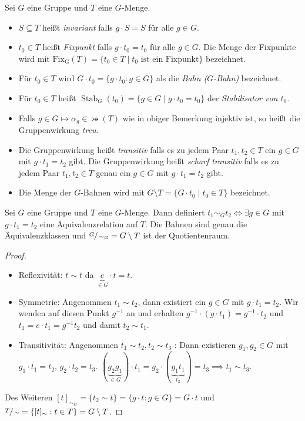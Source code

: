 \begin{definition}
	Sei $G$ eine Gruppe und $T$ eine $G$-Menge.
	\begin{itemize}
		\item $S \subseteq T$ heißt \emph{invariant} falls $g \cdot S = S$ für alle $g \in G$.
		\item $t_0 \in T$ heißt \emph{Fixpunkt} falls $g \cdot t_0 = t_0$ für alle $g \in G$.
			Die Menge der Fixpunkte wird mit $\operatorname{Fix_{G}}(T) = \{t_0 \in T \mid t_0 \text{ ist ein Fixpunkt}\} $ bezeichnet.
		\item Für $t_0 \in T$ wird $G \cdot t_0 = \{g \cdot t_0 : g \in G\}$ als die \emph{Bahn ($G$-Bahn)} bezeichnet.
		\item Für $t_0 \in T$ heißt $\operatorname{Stab}_{G}(t_0) = \{g \in G \mid g \cdot t_0 = t_0\}$ der \emph{Stabilisator von $t_0$}.
		\item Falls $g \in G \mapsto \alpha_{g} \in \bij(T)$ wie in obiger Bemerkung injektiv ist, so heißt die Gruppenwirkung \emph{treu}.
		\item Die Gruppenwirkung heißt \emph{transitiv} falls es zu jedem Paar $t_1,t_2 \in T$ ein $g \in G$ mit $g \cdot  t_1 = t_2$ gibt.
			Die Gruppenwirkung heißt \emph{scharf transitiv} falls es zu jedem Paar $t_1,t_2 \in T$ genau ein $g \in G$ mit $g \cdot t_1 = t_2$ gibt.
		\item Die Menge der $G$-Bahnen wird mit $G \setminus T = \{G \cdot t_0 \mid t_0 \in T\} $ bezeichnet.
	\end{itemize}
\end{definition}


\begin{lemma}
	Sei $G$ eine Gruppe und $T$ eine $G$-Menge.
	Dann definiert $t_1 \sim_{G} t_2 \Leftrightarrow \exists g \in G$ mit $g \cdot t_1 = t_2$ eine Äquivalenzrelation auf $T$. Die Bahnen sind genau die Äquivalenzklassen
	und $\sfrac{G}{\sim_{G}} = G \setminus T$ ist der Quotientenraum.
\end{lemma}

\begin{proof}
	\begin{itemize}
		\item Reflexivität: $t \sim t$ da $\underbrace{e}_{\in G} \cdot  t = t$.
		\item Symmetrie: Angenommen $t_1 \sim t_2$, dann existiert ein $g \in G$ mit $g \cdot t_1 = t_2$.
			Wir wenden auf diesen Punkt $g^{-1}$ an und erhalten $g^{-1} \cdot (g \cdot t_1) = g^{-1} \cdot t_2$ und
			$t_1 = e \cdot t_1 = g^{-1} t_2$ und damit $t_2 \sim t_1$.
		\item Transitivität: Angenommen $t_1 \sim t_2, t_2 \sim t_3$ : Dann existieren $g_1, g_2 \in G$ mit $g_1 \cdot t_1 = t_2$, $g_2 \cdot t_2 = t_3$.
			$(\underbrace{g_2 g_1}_{\in G}) \cdot t_1 = g_2 \cdot (\underbrace{g_1 t_1}_{t_2}) = t_3 \implies t_1 \sim t_3$.
	\end{itemize}
	Des Weiteren $[ t ]_{\sim_{G}} = \{t_2 \sim t\} = \{g \cdot t : g \in G\} = G \cdot t$ und $\sfrac{T}{\sim} = \{[ t ]_{\sim} : t \in T\} = G \setminus T$.
\end{proof}


